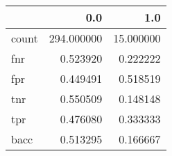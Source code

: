 \begin{tabular}{lrr}
\toprule
{} &         0.0 &        1.0 \\
\midrule
count &  294.000000 &  15.000000 \\
fnr   &    0.523920 &   0.222222 \\
fpr   &    0.449491 &   0.518519 \\
tnr   &    0.550509 &   0.148148 \\
tpr   &    0.476080 &   0.333333 \\
bacc  &    0.513295 &   0.166667 \\
\bottomrule
\end{tabular}
